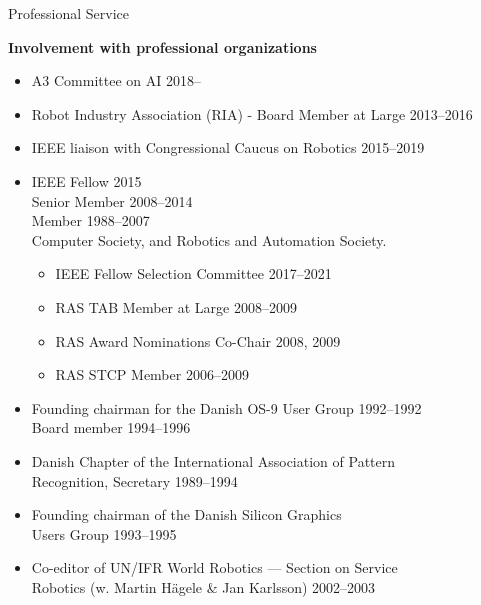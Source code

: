 \documentclass{article}
\begin{document}
\begin{cv}
\begin{cvlist}{Professional Service}
\item {\bf Involvement with professional organizations}
  \begin{itemize}
  \item A3 Committee on AI \cftdotfill{\cftdotsep} 2018--
  \item Robot Industry Association (RIA) - Board Member at Large
    \cftdotfill{\cftdotsep} 2013--2016
  \item IEEE liaison with Congressional Caucus on Robotics
    \cftdotfill{\cftdotsep}  2015--2019
  \item IEEE Fellow \cftdotfill{\cftdotsep} 2015\\
    Senior Member \cftdotfill{\cftdotsep} 2008--2014\\
    Member \cftdotfill{\cftdotsep} 1988--2007\\
    Computer Society, and Robotics and Automation Society.
    \begin{itemize}
    \item IEEE Fellow Selection Committee \cftdotfill{\cftdotsep} 2017--2021
    \item RAS TAB Member at Large \cftdotfill{\cftdotsep} 2008--2009
    \item RAS Award Nominations Co-Chair \cftdotfill{\cftdotsep} 2008, 2009
    \item RAS STCP Member \cftdotfill{\cftdotsep} 2006--2009
    \end{itemize}
  \item Founding chairman for the Danish OS-9 User Group
    \cftdotfill{\cftdotsep} 1992--1992\\ Board member
    \cftdotfill{\cftdotsep} 1994--1996
  \item Danish Chapter of the International Association of
    Pattern\\ Recognition, Secretary \cftdotfill{\cftdotsep}
    1989--1994
  \item Founding chairman of the Danish Silicon Graphics \\Users Group
    \cftdotfill{\cftdotsep} 1993--1995
  \item Co-editor of UN/IFR World Robotics --- Section on
    Service\\ Robotics (w. Martin H\"agele \& Jan Karlsson)
    \cftdotfill{\cftdotsep} 2002--2003
  \end{itemize}


\end{cvlist}
\end{cv}
\end{document}

